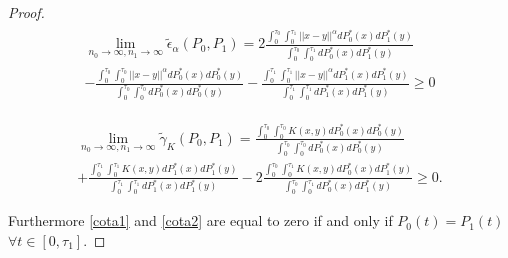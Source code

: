 \documentclass[11pt]{article}
\begin{document}
\begin{appendices}
\begin{proof}
	\begin{gather}\label{cota1}
	\begin{align}
	\lim_{n_0\to \infty,n_1 \to \infty} \tilde{\epsilon}_\alpha(P_0,P_1)= 
	2\frac{\int_{0}^{\tau_0} \int_{0}^{\tau_1}	 ||x-y||^{\alpha} dP_0^{*}(x) dP_1^{*}(y)}{\int_{0}^{\tau_0} \int_{0}^{\tau_1} dP_0^{*}(x) dP_1^{*}(y)}\\
	-\frac{\int_{0}^{\tau_0} \int_{0}^{\tau_0}	 ||x-y||^{\alpha} dP_0^{*}(x) dP_0^{*}(y)}{\int_{0}^{\tau_0} \int_{0}^{\tau_0} dP_0^{*}(x) dP_0^{*}(y)} -\frac{\int_{0}^{\tau_1}\int_{0}^{\tau_1}	 ||x-y||^{\alpha} dP_1^{*}(x) dP_1^{*}(y)}{\int_{0}^{\tau_1}\int_{0}^{\tau_1} dP_1^{*}(x) dP_1^{*}(y)} \geq 0 \nonumber
	\end{align}
	\end{gather}
	
	\begin{align}\label{cota2}
	\lim_{n_0\to \infty,n_1 \to \infty} \tilde{\gamma}_K(P_0,P_1)= \frac{\int_{0}^{\tau_0} \int_{0}^{\tau_0}	 K(x,y) dP_0^{*}(x) dP_0^{*}(y)}{\int_{0}^{\tau_0} \int_{0}^{\tau_0}	  dP_0^{*}(x) dP_0^{*}(y)} \\
	+\frac{\int_{0}^{\tau_1}\int_{0}^{\tau_1}	K(x,y) dP_1^{*}(x) dP_1^{*}(y)}{\int_{0}^{\tau_1}\int_{0}^{\tau_1} dP_1^{*}(x) dP_1^{*}(y)}  -2   \frac{\int_{0}^{\tau_0} \int_{0}^{\tau_1}	 K(x,y) dP_0^{*}(x) dP_1^{*}(y)}{\int_{0}^{\tau_0} \int_{0}^{\tau_1} dP_0^{*}(x) dP_1^{*}(y)} \geq 0  \nonumber.
	\end{align}
	
		
		Furthermore \ref{cota1} and \ref{cota2} are equal to zero if and only if  $P_0(t)= P_1(t)$ $\forall t \in [0,\tau_1]$.
	
	
	

\end{proof}
\end{appendices}
\end{document}
